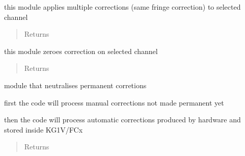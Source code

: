 \documentclass[letterpaper,10pt,english]{sphinxmanual}
\begin{document}
\begin{fulllineitems}
\begin{fulllineitems}
\begin{quote}
\begin{description}
\end{description}\end{quote}

\end{fulllineitems}


\begin{fulllineitems}
\label{Cormat_main:Cormat_main.CORMAT_GUI.multiplecorrections}
this module applies multiple corrections (same fringe correction) to selected channel
\begin{quote}\begin{description}
\item[{Returns}] \leavevmode


\end{description}\end{quote}

\end{fulllineitems}


\begin{fulllineitems}
\label{Cormat_main:Cormat_main.CORMAT_GUI.zeroingcorrection}
this module zeroes correction on selected channel
\begin{quote}\begin{description}
\item[{Returns}] \leavevmode


\end{description}\end{quote}

\end{fulllineitems}


\begin{fulllineitems}
\label{Cormat_main:Cormat_main.CORMAT_GUI.neutralisatecorrections}
module that neutralises permanent corretions

first the code will process manual corrections not made permanent yet

then the code will process automatic corrections produced by hardware and stored inside KG1V/FCx
\begin{quote}\begin{description}
\item[{Returns}] \leavevmode



\end{description}
\end{quote}
\end{fulllineitems}
\end{fulllineitems}
\end{document}
